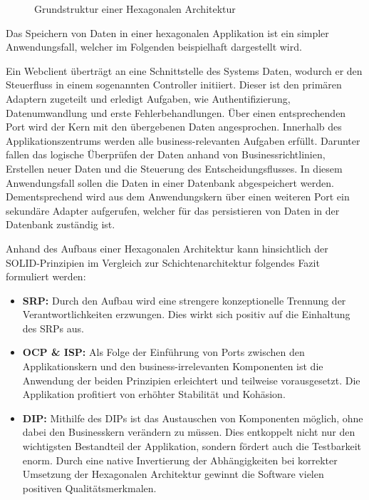 \begin{figure}[htbp]
	\centering
	
	\caption{Grundstruktur einer Hexagonalen Architektur}
	\label{fig:HexagonaleArchitektur}
\end{figure}

Das Speichern von Daten in einer hexagonalen Applikation ist ein simpler Anwendungsfall, welcher im Folgenden beispielhaft dargestellt wird. 

Ein Webclient überträgt an eine Schnittstelle des Systems Daten, wodurch er den Steuerfluss in einem sogenannten Controller initiiert. Dieser ist den primären Adaptern zugeteilt und erledigt Aufgaben, wie Authentifizierung, Datenumwandlung und erste Fehlerbehandlungen. Über einen entsprechenden Port wird der Kern mit den übergebenen Daten angesprochen. Innerhalb des Applikationszentrums werden alle business-relevanten Aufgaben erfüllt. Darunter fallen das logische Überprüfen der Daten anhand von Businessrichtlinien, Erstellen neuer Daten und die Steuerung des Entscheidungsflusses. In diesem Anwendungsfall sollen die Daten in einer Datenbank abgespeichert werden. Dementsprechend wird aus dem Anwendungskern über einen weiteren Port ein sekundäre Adapter aufgerufen, welcher für das persistieren von Daten in der Datenbank zuständig ist. 

Anhand des Aufbaus einer Hexagonalen Architektur kann hinsichtlich der SOLID-Prinzipien im Vergleich zur Schichtenarchitektur folgendes Fazit formuliert werden:

\begin{itemize}[noitemsep,nolistsep,topsep=-2pt]
	\item \textbf{\acrshort{SRP}: } {Durch den Aufbau wird eine strengere konzeptionelle Trennung der Verantwortlichkeiten erzwungen. Dies wirkt sich positiv auf die Einhaltung des \acrlong{SRP}s aus.}
	\item \textbf{\acrshort{OCP} \& \acrshort{ISP}: } {Als Folge der Einführung von Ports zwischen den Applikationskern und den business-irrelevanten Komponenten ist die Anwendung der beiden Prinzipien erleichtert und teilweise vorausgesetzt. Die Applikation profitiert von erhöhter Stabilität und Kohäsion. }
	\item \textbf{\acrshort{DIP}: } {Mithilfe des \acrlong{DIP}s ist das Austauschen von Komponenten möglich, ohne dabei den Businesskern verändern zu müssen. Dies entkoppelt nicht nur den wichtigsten Bestandteil der Applikation, sondern fördert auch die Testbarkeit enorm. Durch eine native Invertierung der Abhängigkeiten bei korrekter Umsetzung der Hexagonalen Architektur gewinnt die Software vielen positiven Qualitätsmerkmalen.}
\end{itemize}


